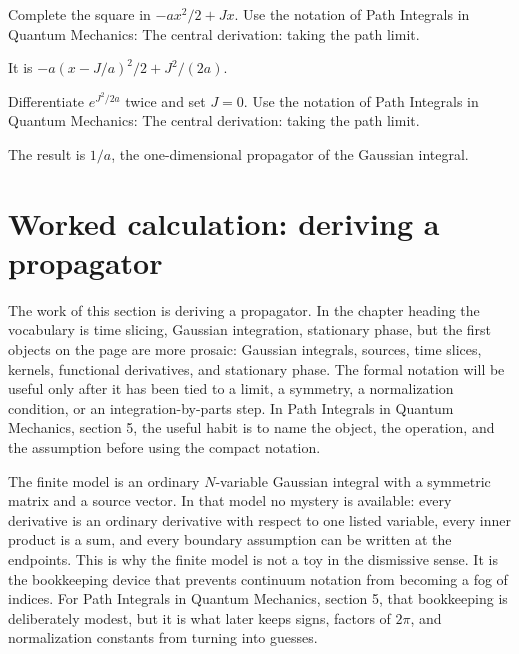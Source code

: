 \begin{exercise}
Complete the square in \(-ax^2/2+Jx\).  Use the notation of Path Integrals in Quantum Mechanics: The central derivation: taking the path limit.
\begin{answer}
It is \(-a(x-J/a)^2/2+J^2/(2a)\).
\end{answer}
\end{exercise}

\begin{exercise}
Differentiate \(e^{J^2/2a}\) twice and set \(J=0\).  Use the notation of Path Integrals in Quantum Mechanics: The central derivation: taking the path limit.
\begin{answer}
The result is \(1/a\), the one-dimensional propagator of the Gaussian integral.
\end{answer}
\end{exercise}



\section{Worked calculation: deriving a propagator}













The work of this section is deriving a propagator.  In the chapter heading the vocabulary is time slicing, Gaussian integration, stationary phase, but the first objects on the page are more prosaic: Gaussian integrals, sources, time slices, kernels, functional derivatives, and stationary phase.  The formal notation will be useful only after it has been tied to a limit, a symmetry, a normalization condition, or an integration-by-parts step.  In Path Integrals in Quantum Mechanics, section 5, the useful habit is to name the object, the operation, and the assumption before using the compact notation.

The finite model is an ordinary \(N\)-variable Gaussian integral with a symmetric matrix and a source vector.  In that model no mystery is available: every derivative is an ordinary derivative with respect to one listed variable, every inner product is a sum, and every boundary assumption can be written at the endpoints.  This is why the finite model is not a toy in the dismissive sense.  It is the bookkeeping device that prevents continuum notation from becoming a fog of indices.  For Path Integrals in Quantum Mechanics, section 5, that bookkeeping is deliberately modest, but it is what later keeps signs, factors of \(2\pi\), and normalization constants from turning into guesses.

